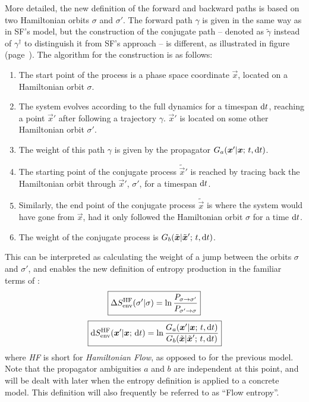 More detailed, the new definition of the forward and backward paths is based on two Hamiltonian orbits \(\sigma\) and \(\sigma'\). The forward path \(\gamma\) is given in the same way as in SF's model, but the construction of the conjugate path -- denoted as \(\tilde\gamma\) instead of \(\gamma^\dagger\) to distinguish it from SF's approach -- is different, as illustrated in figure~ (page~\pageref{fig:hf sf}). The algorithm for the construction is as follows:
%
\begin{enumerate}
	\item The start point of the process is a phase space coordinate \(\vec x\), located on a Hamiltonian orbit \(\sigma\).
	\item The system evolves according to the full dynamics for a timespan \(\mathrm{d} t\), reaching a point \(\vec x'\) after following a trajectory \(\gamma\). \(\vec x'\) is located on some other Hamiltonian orbit \(\sigma'\).
	\item The weight of this path \(\gamma\) is given by the propagator \(G_a(\boldsymbol{x}'|\boldsymbol{x};\,t,\mathrm{d} t)\).
	\item The starting point of the conjugate process \(\tilde{\vec x}'\) is reached by tracing back the Hamiltonian orbit through \(\vec x'\), \(\sigma'\), for a timespan \(\mathrm{d} t\).
	\item Similarly, the end point of the conjugate process \(\tilde{\vec x}\) is where the system would have gone from \(\vec x\), had it only followed the Hamiltonian orbit \(\sigma\) for a time \(\mathrm{d} t\).
	\item The weight of the conjugate process is \(G_b(\tilde{\boldsymbol{x}}|\tilde{\boldsymbol{x}}';\,t,\mathrm{d} t)\).
\end{enumerate}
%
This can be interpreted as calculating the weight of a jump between the orbits \(\sigma\) and \(\sigma'\), and enables the new definition of entropy production in the familiar terms of :
%
\begin{equation}
	\boxed{
	\Delta S_\text{env}^{\text{HF}}(\sigma'|\sigma)
	= \ln\frac{P_{\sigma\to\sigma'}}{P_{\sigma'\to\sigma}}
	}
\end{equation}
%
\begin{equation}
	\label{eqn:orbitentropy}
	\boxed{
	\mathrm{d}S_\text{env}^{\text{HF}}(\boldsymbol{x}'|\boldsymbol{x};\,\mathrm{d} t)
	= \ln\frac{G_a(\boldsymbol{x}'|\boldsymbol{x};\,t,\mathrm{d} t)}{G_b(\tilde{\boldsymbol{x}}|\tilde{\boldsymbol{x}}';\,t,\mathrm{d} t)}
	}
\end{equation}
%
where \emph{HF} is short for \emph{Hamiltonian Flow}, as opposed to \SF{} for the previous model. Note that the propagator ambiguities \(a\) and \(b\) are independent at this point, and will be dealt with later when the entropy definition is applied to a concrete model. This definition will also frequently be referred to as ``Flow entropy''.
%



